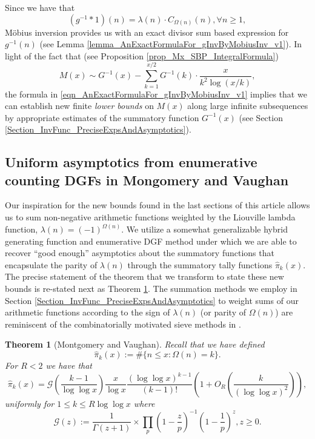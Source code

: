 \documentclass[11pt,reqno,a4letter]{article}
\numberwithin{figure}{section}
\numberwithin{table}{section}
\theoremstyle{plain}
\newtheorem{theorem}{Theorem}
\numberwithin{theorem}{section}
\theoremstyle{definition}
\begin{document}
Since we have that 
\begin{equation} 
\label{eqn_AnExactFormulaFor_gInvByMobiusInv_v1} 
(g^{-1} \ast 1)(n) = \lambda(n) \cdot C_{\Omega(n)}(n), \forall n \geq 1, 
\end{equation} 
M\"{o}bius inversion provides us with an exact divisor sum based expression for $g^{-1}(n)$ 
(see Lemma \ref{lemma_AnExactFormulaFor_gInvByMobiusInv_v1}). 
In light of the fact that (see Proposition \ref{prop_Mx_SBP_IntegralFormula}) 
\[
M(x) \sim G^{-1}(x) - \sum_{k=1}^{x/2} G^{-1}(k) \cdot \frac{x}{k^2 \log(x/k)}, 
\]
the formula in \eqref{eqn_AnExactFormulaFor_gInvByMobiusInv_v1} implies that we can establish 
new finite \emph{lower bounds} on $M(x)$ along large infinite subsequences 
by appropriate estimates of the summatory function $G^{-1}(x)$ 
(see Section \ref{Section_InvFunc_PreciseExpsAndAsymptotics}). 

\subsection{Uniform asymptotics from enumerative counting DGFs in Mongomery and Vaughan} 

Our inspiration for the new bounds found in the last sections of this article allows us to sum 
non-negative arithmetic functions weighted by the Liouville lambda function, 
$\lambda(n) = (-1)^{\Omega(n)}$. 
We utilize a somewhat generalizable 
hybrid generating function and enumerative DGF method 
under which we are able to recover ``good enough'' asymptotics about the summatory functions that 
encapsulate the parity of $\lambda(n)$ through the summatory tally functions $\widehat{\pi}_k(x)$. 
The precise statement of the theorem that we transform to state these new bounds is re-stated next as 
Theorem \ref{theorem_HatPi_ExtInTermsOfGz}. 
The summation methods we employ in Section \ref{Section_InvFunc_PreciseExpsAndAsymptotics} 
to weight sums of our arithmetic functions according to the sign of 
$\lambda(n)$ (or parity of $\Omega(n)$) are 
reminiscent of the combinatorially motivated sieve methods in 
\cite[\S 17]{OPERADECRIBERO}. 

\begin{theorem}[Montgomery and Vaughan]
\label{theorem_HatPi_ExtInTermsOfGz} 
Recall that we have defined 
$$\widehat{\pi}_k(x) := \#\{n \leq x: \Omega(n)=k\}.$$ 
For $R < 2$ we have that 
\[
\widehat{\pi}_k(x) = \mathcal{G}\left(\frac{k-1}{\log\log x}\right) \frac{x}{\log x} 
     \frac{(\log\log x)^{k-1}}{(k-1)!} \left(1 + O_R\left(\frac{k}{(\log\log x)^2}\right)\right),  
\]
uniformly for $1 \leq k \leq R \log\log x$ where 
\[
\mathcal{G}(z) := \frac{1}{\Gamma(z+1)} \times 
     \prod_p \left(1-\frac{z}{p}\right)^{-1} \left(1-\frac{1}{p}\right)^z, z \geq 0. 
\]
\end{theorem} 
\end{document}
